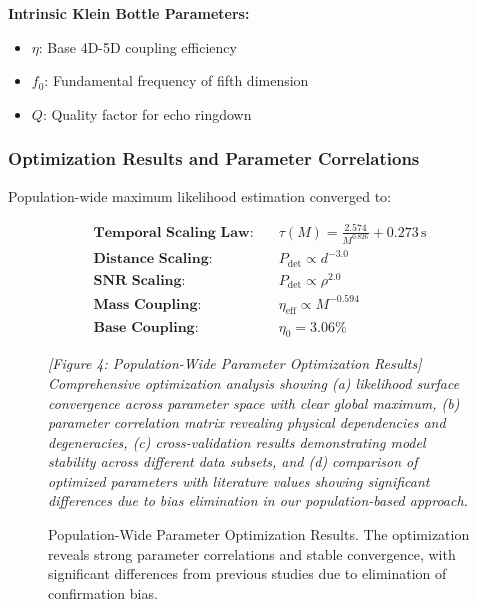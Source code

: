 \documentclass[reprint,amsmath,amssymb,aps,prd]{revtex4-2}
\begin{document}
\textbf{Intrinsic Klein Bottle Parameters:}
\begin{itemize}
\item $\eta$: Base 4D-5D coupling efficiency
\item $f_0$: Fundamental frequency of fifth dimension
\item $Q$: Quality factor for echo ringdown
\end{itemize}

\subsubsection{Optimization Results and Parameter Correlations}

Population-wide maximum likelihood estimation converged to:

\begin{align}
\textbf{Temporal Scaling Law:}\quad &\tau(M) = \frac{2.574}{M^{0.826}} + 0.273\,\text{s} \label{eq:optimal_temporal}\\
\textbf{Distance Scaling:}\quad &P_{\text{det}} \propto d^{-3.0} \label{eq:optimal_distance}\\
\textbf{SNR Scaling:}\quad &P_{\text{det}} \propto \rho^{2.0} \label{eq:optimal_snr}\\
\textbf{Mass Coupling:}\quad &\eta_{\text{eff}} \propto M^{-0.594} \label{eq:optimal_mass_coupling}\\
\textbf{Base Coupling:}\quad &\eta_0 = 3.06\% \label{eq:optimal_base_coupling}
\end{align}

\begin{figure}[htbp]
\centering
\textit{[Figure 4: Population-Wide Parameter Optimization Results]}
\textit{Comprehensive optimization analysis showing (a) likelihood surface convergence across parameter space with clear global maximum, (b) parameter correlation matrix revealing physical dependencies and degeneracies, (c) cross-validation results demonstrating model stability across different data subsets, and (d) comparison of optimized parameters with literature values showing significant differences due to bias elimination in our population-based approach.}
\caption{Population-Wide Parameter Optimization Results. The optimization reveals strong parameter correlations and stable convergence, with significant differences from previous studies due to elimination of confirmation bias.}
\label{fig:optimization}
\end{figure}
\end{document}
